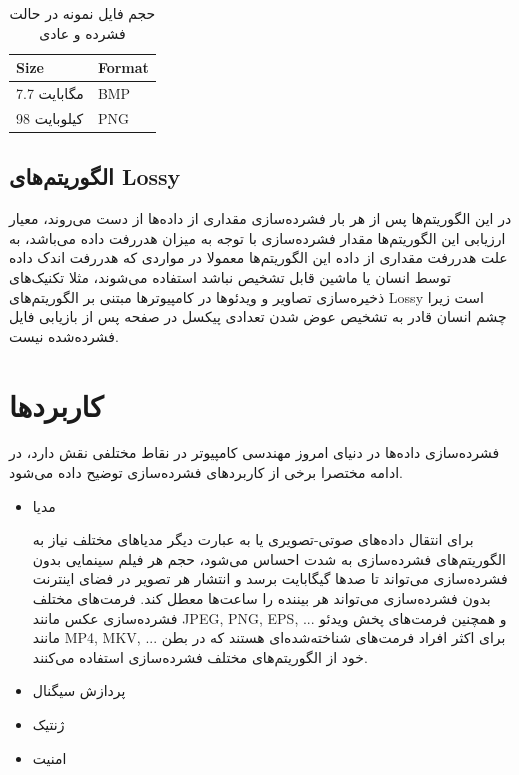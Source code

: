 \begin{table}
	\centering
	\caption{حجم فایل نمونه در حالت فشرده و عادی}
	\label{compare_1}
	\begin{tabular}{@{}ll@{}}
	\toprule
	Size & Format \\ \midrule
	7.7 مگابایت & BMP \\
	98 کیلوبایت & PNG \\ \bottomrule
	\end{tabular}
	\end{table}

\subsection{الگوریتم‌های Lossy}

در این الگوریتم‌ها پس از هر بار فشرده‌سازی مقداری از داده‌ها از دست می‌روند، معیار ارزیابی این الگوریتم‌ها 
مقدار فشرده‌سازی با توجه به میزان هدررفت داده می‌باشد، به علت هدررفت مقداری از داده این الگوریتم‌ها معمولا در 
مواردی که هدررفت اندک داده توسط انسان یا ماشین قابل تشخیص نباشد استفاده می‌شوند،‌ مثلا تکنیک‌های 
ذخیره‌سازی تصاویر و ویدئو‌ها در کامپیوترها مبتنی بر الگوریتم‌های Lossy 
است زیرا چشم انسان قادر به تشخیص عوض شدن تعدادی پیکسل در صفحه پس از بازیابی فایل فشرده‌شده نیست. 



\section{کاربردها}
فشرده‌سازی داده‌ها در دنیای امروز مهندسی کامپیوتر در نقاط مختلفی نقش دارد، در ادامه مختصرا برخی از کاربردهای 
فشرده‌سازی توضیح داده می‌شود.

\begin{itemize}
	\item مدیا
	
	برای انتقال داده‌های صوتی-تصویری یا به عبارت دیگر مدیاهای مختلف نیاز به الگوریتم‌های فشرده‌سازی به شدت احساس
	می‌شود، حجم هر فیلم سینمایی بدون فشرده‌سازی می‌تواند تا صدها گیگابایت برسد و انتشار هر تصویر در فضای اینترنت
	بدون فشرده‌سازی می‌تواند هر بیننده را ساعت‌ها معطل کند. فرمت‌های مختلف فشرده‌سازی عکس مانند
	JPEG, PNG, EPS, ...
	 و همچنین فرمت‌های پخش ویدئو‌ مانند 
	 MP4, MKV, ...
	 برای اکثر افراد فرمت‌های شناخته‌شده‌ای هستند که در بطن خود از الگوریتم‌های مختلف فشرده‌سازی استفاده می‌کنند.
	\item پردازش سیگنال\\
	
	\item ژنتیک\\
	
	\item امنیت\\
\end{itemize}